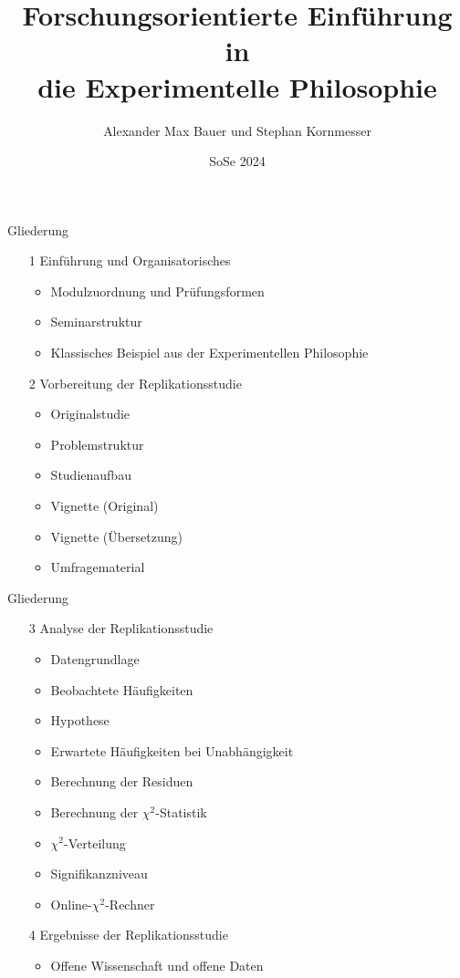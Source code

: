 \documentclass[xcolor=table,9pt,aspectratio=169]{beamer}
\title{Forschungsorientierte Einführung in \\die Experimentelle Philosophie}
\subtitle{}
\author{Alexander Max Bauer und Stephan Kornmesser}
\date{SoSe 2024}
\begin{document}
{
\begin{frame}
   \maketitle
\end{frame}
}

\begin{frame}{\vspace*{10mm}Gliederung}
\begin{itemize}
   \item[1] Einführung und Organisatorisches
   \begin{itemize}
      \item Modulzuordnung und Prüfungsformen
      \item Seminarstruktur
      \item Klassisches Beispiel aus der Experimentellen Philosophie
   \end{itemize}
   \item[2] Vorbereitung der Replikationsstudie
   \begin{itemize}
      \item Originalstudie
      \item Problemstruktur
      \item Studienaufbau
      \item Vignette (Original)
      \item Vignette (Übersetzung)
      \item Umfragematerial
   \end{itemize}
\end{itemize}
\end{frame}


\begin{frame}{\vspace*{10mm}Gliederung}
\begin{itemize}
   \item[3] Analyse der Replikationsstudie
   \begin{itemize}
      \item Datengrundlage
      \item Beobachtete Häufigkeiten
      \item Hypothese
      \item Erwartete Häufigkeiten bei Unabhängigkeit
      \item Berechnung der Residuen
      \item Berechnung der $\chi^{2}$-Statistik
      \item $\chi^2$-Verteilung
      \item Signifikanzniveau
      \item Online-$\chi^2$-Rechner
   \end{itemize}
   \item[4] Ergebnisse der Replikationsstudie
   \begin{itemize}
      \item Offene Wissenschaft und offene Daten
   \end{itemize}
\end{itemize}
\end{frame}
\end{document}
